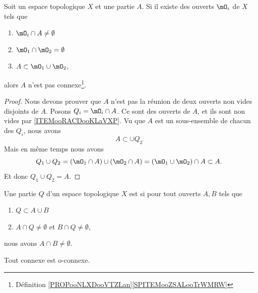 \begin{proposition}	\label{PROPooDYRPooBesEMr}
	Soit un espace topologique \( X\) et une partie \( A\). Si il existe des ouverts \( \mO_i\) de \( X\) tels que
	\begin{enumerate}
		\item   \label{ITEMooRACDooKLaVXP}
		      \( \mO_i\cap A\neq\emptyset\)
		\item       \label{ITEMooNCQVooNjAYCT}
		      \( \mO_1\cap\mO_2=\emptyset\)
		\item       \label{ITEMooPIHJooNJYpQo}
		      \( A\subset  \mO_1\cup\mO_2  \),
	\end{enumerate}
	alors \( A\) n'est pas connexe\footnote{Définition \ref{PROPooNLXDooVTZLan}\ref{SPITEMooZSALooTrWMRW}}.
\end{proposition}


\begin{proof}
	Nous devons prouver que \( A\) n'est pas la réunion de deux ouverts non vides disjoints de \( A\). Posons \( Q_i=\mO_i\cap A\). Ce sont des ouverts de \( A\), et ils sont non vides par \ref{ITEMooRACDooKLaVXP}. Vu que \( A\) est un sous-ensemble de chacun des \( Q_i\), nous avons
	\begin{equation}
		A\subset \cup Q_2
	\end{equation}
	Mais en même temps nous avons
	\begin{equation}
		Q_1\cup Q_2=(\mO_1\cap A)\cup(\mO_2\cap A)=(\mO_1\cup\mO_2)\cap A\subset A.
	\end{equation}
	Et donc \( Q_1\cup Q_2=A\).
\end{proof}



\begin{definition}	\label{DEFooJYCDooGNEDoC}
	Une partie \( Q\) d'un espace topologique \( X\) est  si pour tout ouverts \( A,B\) tels que
	\begin{enumerate}
		\item
		      \( Q\subset A\cup B\)
		\item
		      \( A\cap Q\neq\emptyset\) et \( B\cap Q\neq \emptyset\),
	\end{enumerate}
	nous avons \( A\cap B\neq \emptyset\).
\end{definition}


\begin{proposition}	\label{PROPooQHJXooMNrxOJ}
	Tout connexe est o-connexe.
\end{proposition}


